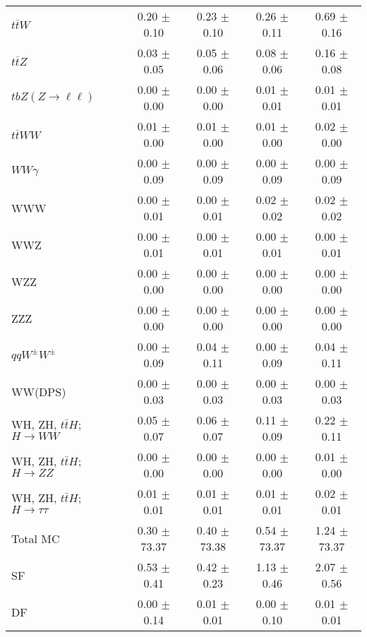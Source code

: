 \begin{tabular}{l|cccc}
                   $t\overline{t}W$ &  0.20 $\pm$  0.10 &  0.23 $\pm$  0.10 &  0.26 $\pm$  0.11 &  0.69 $\pm$  0.16 \\
                   $t\overline{t}Z$ &  0.03 $\pm$  0.05 &  0.05 $\pm$  0.06 &  0.08 $\pm$  0.06 &  0.16 $\pm$  0.08 \\
    $tbZ (Z \rightarrow \ell \ell)$ &  0.00 $\pm$  0.00 &  0.00 $\pm$  0.00 &  0.01 $\pm$  0.01 &  0.01 $\pm$  0.01 \\
                  $t\overline{t}WW$ &  0.01 $\pm$  0.00 &  0.01 $\pm$  0.00 &  0.01 $\pm$  0.00 &  0.02 $\pm$  0.00 \\
                         $WW\gamma$ &  0.00 $\pm$  0.09 &  0.00 $\pm$  0.09 &  0.00 $\pm$  0.09 &  0.00 $\pm$  0.09 \\
                                WWW &  0.00 $\pm$  0.01 &  0.00 $\pm$  0.01 &  0.02 $\pm$  0.02 &  0.02 $\pm$  0.02 \\
                                WWZ &  0.00 $\pm$  0.01 &  0.00 $\pm$  0.01 &  0.00 $\pm$  0.01 &  0.00 $\pm$  0.01 \\
                                WZZ &  0.00 $\pm$  0.00 &  0.00 $\pm$  0.00 &  0.00 $\pm$  0.00 &  0.00 $\pm$  0.00 \\
                                ZZZ &  0.00 $\pm$  0.00 &  0.00 $\pm$  0.00 &  0.00 $\pm$  0.00 &  0.00 $\pm$  0.00 \\
                 $qqW^{\pm}W^{\pm}$ &  0.00 $\pm$  0.09 &  0.04 $\pm$  0.11 &  0.00 $\pm$  0.09 &  0.04 $\pm$  0.11 \\
                            WW(DPS) &  0.00 $\pm$  0.03 &  0.00 $\pm$  0.03 &  0.00 $\pm$  0.03 &  0.00 $\pm$  0.03 \\
WH, ZH, $t\bar{t}H$; $H \rightarrow WW$ &  0.05 $\pm$  0.07 &  0.06 $\pm$  0.07 &  0.11 $\pm$  0.09 &  0.22 $\pm$  0.11 \\
WH, ZH, $t\bar{t}H$; $H \rightarrow ZZ$ &  0.00 $\pm$  0.00 &  0.00 $\pm$  0.00 &  0.00 $\pm$  0.00 &  0.01 $\pm$  0.00 \\
WH, ZH, $t\bar{t}H$; $H \rightarrow \tau\tau$ &  0.01 $\pm$  0.01 &  0.01 $\pm$  0.01 &  0.01 $\pm$  0.01 &  0.02 $\pm$  0.01 \\
\hline\hline
                           Total MC &  0.30 $\pm$ 73.37 &  0.40 $\pm$ 73.38 &  0.54 $\pm$ 73.37 &  1.24 $\pm$ 73.37 \\
\hline
                                 SF &  0.53 $\pm$  0.41 &  0.42 $\pm$  0.23 &  1.13 $\pm$  0.46 &  2.07 $\pm$  0.56 \\
                                 DF &  0.00 $\pm$  0.14 &  0.01 $\pm$  0.01 &  0.00 $\pm$  0.10 &  0.01 $\pm$  0.01 \\

\end{tabular}
